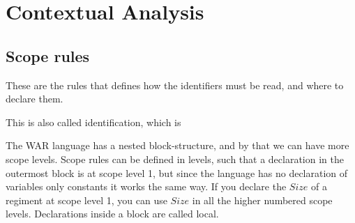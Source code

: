 \section{Contextual Analysis}

	\subsection{Scope rules}
	These are the rules that defines how the identifiers must be read, and where to declare them.
	
	This is also called identification, which is 
	
	
	
	
	
	
	
	The WAR language has a nested block-structure, and by that we can have more scope levels. 
	Scope rules can be defined in levels, such that a declaration in the outermost block is at scope level 1, but since the language has no declaration of variables only constants it works the same way. If you declare the $Size$ of a regiment at scope level 1, you can use $Size$ in all the higher numbered scope levels. Declarations inside a block are called local.
	
	
	
	
	
	
	

